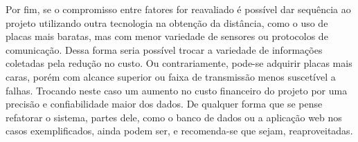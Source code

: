 Por fim, se o compromisso entre fatores for reavaliado é possível dar sequência ao projeto utilizando outra tecnologia na obtenção da distância, como o uso de placas mais baratas, mas com menor variedade de sensores ou protocolos de comunicação. Dessa forma seria possível trocar a variedade de informações coletadas pela redução no custo. Ou contrariamente, pode-se adquirir placas mais caras, porém com alcance superior ou faixa de transmissão menos suscetível a falhas. Trocando neste caso um aumento no custo financeiro do projeto por uma precisão e confiabilidade maior dos dados. De qualquer forma que se pense refatorar o sistema, partes dele, como o banco de dados ou a aplicação web nos casos exemplificados, ainda podem ser, e recomenda-se que sejam, reaproveitadas.
